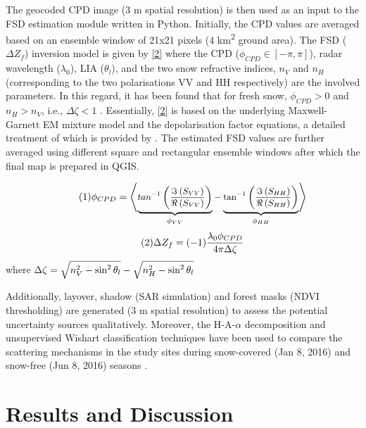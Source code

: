 \documentclass{article}
\begin{document}
The geocoded CPD image (3 m spatial resolution) is then used as an input to the FSD estimation module written in Python. Initially, the CPD values are averaged based on an ensemble window of 21x21 pixels (4 km\textsuperscript{2} ground area). The FSD ($\Delta Z_f$) inversion model is given by \eqref{2} where the CPD ($\phi_{CPD}\in[-\pi,\pi]$), radar wavelength ($\lambda_0$), LIA ($\theta_l$), and the two snow refractive indices, $n_V$ and $n_H$ (corresponding to the two polarisations VV and HH respectively) are the involved parameters. In this regard, it has been found that for fresh snow,  $\phi_{CPD}>0$ and $n_H>n_V$, i.e., $\Delta{\zeta}<1$ \cite{Leinss2014}. Essentially, \eqref{2} is based on the underlying Maxwell-Garnett EM mixture model and the depolarisation factor equations, a detailed treatment of which is provided by \cite{Sihvola1999}. The estimated FSD values are further averaged using different square and rectangular ensemble windows after which the final map is prepared in QGIS.
\vspace{-1.9ex}
\begin{center}
    \vspace{-1.9ex}
    \begin{equation}\tag{1}
        \small{\phi_{CPD} =\left\langle\underbrace{tan^{-1}\left(\frac{\Im\left(S_{VV}\right)}{\Re\left(S_{VV}\right)}\right)}_{\phi_{VV}} - \underbrace{\tan^{-1}\left(\frac{\Im\left(S_{HH}\right)}{\Re\left(S_{HH}\right)}\right)}_{\phi_{HH}}\right\rangle}
        \label{1}
    \end{equation}
    \begin{equation}\tag{2}
        \small{\Delta{Z_f} = (-1)\frac{\lambda_0\phi_{CPD}}{4\pi\Delta{\zeta}}}
        \label{2}
    \end{equation}
    \centering
    where $\small{\Delta{\zeta} = \sqrt{n^2_V - \sin^{2}\theta_l} - \sqrt{n^2_H - \sin^{2}\theta_l}}$
\end{center}

Additionally, layover, shadow (SAR simulation) and forest masks (NDVI thresholding) are generated (3 m spatial resolution) to assess the potential uncertainty sources qualitatively. Moreover, the H-A-$\alpha$ decomposition and unsupervised Wishart classification techniques have been used to compare the scattering mechanisms in the study sites during snow-covered (Jan 8, 2016) and snow-free (Jun 8, 2016) seasons \cite{Singh2014}.     

\section{Results and Discussion}
\label{sec:results}
\end{document}
